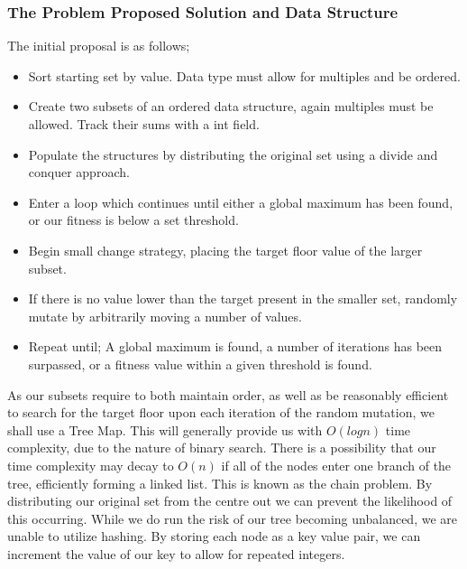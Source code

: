 \documentclass[a4paper]{article}
\begin{document}
\vspace{8mm}
\subsubsection{The Problem Proposed Solution and Data Structure}

\vspace{4mm}
The initial proposal is as follows;

\vspace{2mm}
\begin{itemize}
  \item Sort starting set by value. Data type must allow for multiples and be ordered.
  \item Create two subsets of an ordered data structure, again multiples must be allowed.
        Track their sums with a int field.
  \item Populate the structures by distributing the original set using a divide and conquer approach.

  \item Enter a loop which continues until either a global maximum has been found, 
    or our fitness is below a set threshold.
  \item Begin small change strategy, placing the target floor value of the larger subset.

  \item If there is no value lower than the target present in the smaller set,
    randomly mutate by arbitrarily moving a number of values.

  \item Repeat until; A global maximum is found, a number of iterations has been surpassed,
    or a fitness value within a given threshold is found.
\end{itemize}
\newpage

As our subsets require to both maintain order, as well as be reasonably efficient to search for the target floor upon each iteration of the random mutation,
we shall use a Tree Map. This will generally provide us with $O(logn)$ time complexity, due to the nature of binary search. 
There is a possibility that our time complexity may decay to $O(n)$ if all of the nodes enter one branch of the tree,
efficiently forming a linked list. This is known as the chain problem. 
By distributing our original set from the centre out we can prevent the likelihood of this occurring.
While we do run the risk of our tree becoming unbalanced, we are unable to utilize hashing.
By storing each node as a key value pair, we can increment the value of our key to allow for repeated integers. 
\vspace{4mm}
\end{document}
